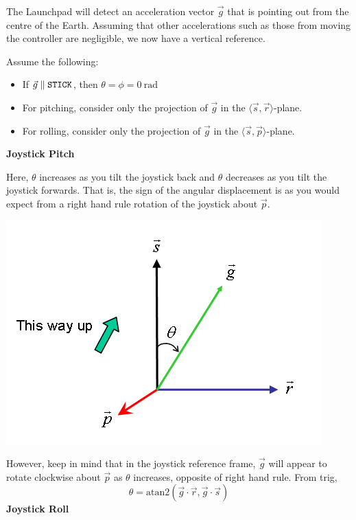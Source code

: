 \documentclass[12pt]{article}
\begin{document}
	The Launchpad will detect an acceleration vector $\vec{g}$ that is pointing out from the centre of the Earth. 
	Assuming that other accelerations such as those from moving the controller are negligible, we now have a vertical reference. 
	
	Assume the following:
	\begin{itemize}
		\item If $\vec{g} \parallel \verb|STICK|$, then $\theta = \phi = \SI{0}{\radian}$
		\item For pitching, consider only the projection of $\vec{g}$ in the $\langle \vec{s}, \vec{r} \rangle$-plane.
		\item For rolling, consider only the projection of $\vec{g}$ in the $\langle \vec{s}, \vec{p} \rangle$-plane.
	\end{itemize}
	
	\textbf{Joystick Pitch}
	
	Here, $\theta$ increases as you tilt the joystick back
	and $\theta$ decreases as you tilt the joystick forwards.
	That is, the sign of the angular displacement is as you would expect
	from a right hand rule rotation of the joystick about $\vec{p}$.	
	\begin{center}\includegraphics{jpitch.png}\end{center}
	However, keep in mind that in the joystick reference frame,
	$\vec{g}$ will appear to rotate clockwise about $\vec{p}$ as $\theta$ increases,
	opposite of right hand rule. From trig,
		$$\theta = \text{atan2}(\vec{g} \cdot \vec{r}, \vec{g} \cdot \vec{s})$$	
	\textbf{Joystick Roll}
	
\end{document}
